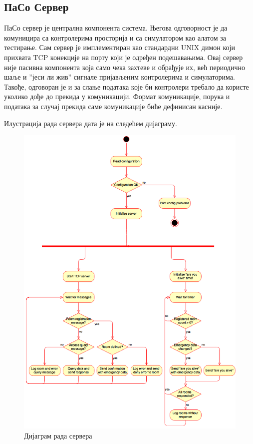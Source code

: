 \documentclass[a4paper, 12pt, diplomski]{etfcyr}
\begin{document}
             \subsection{ПаСо Сервер}
                 \begin{justify}
                     ПаСо сервер је централна компонента система. Његова одговорност је да комуницира са контролерима просторија и са симулатором као алатом за тестирање. Сам сервер је имплементиран као стандардни UNIX димон који прихвата TCP конекције на порту који је одређен подешавањима. Овај сервер није пасивна компонента која само чека захтеве и обрађује их, већ периодично шаље и ”јеси ли жив” сигнале пријављеним контролерима и симулаторима. Такође, одговоран је и за слање података које би контролери требало да користе уколико дође до прекида у комуникацији. Формат комуникације, порука и података за случај прекида саме комуникације биће дефинисан касније.
                     
                     Илустрација рада сервера дата је на следећем дијаграму.
                     \begin{figure}[h]
                         \begin{center}
                             \includegraphics[scale=0.30]{ServerWorkflow.png}
                           \end{center}
                           \caption{Дијаграм рада сервера}
                       \end{figure}
                 \end{justify}
                 
\end{document}
